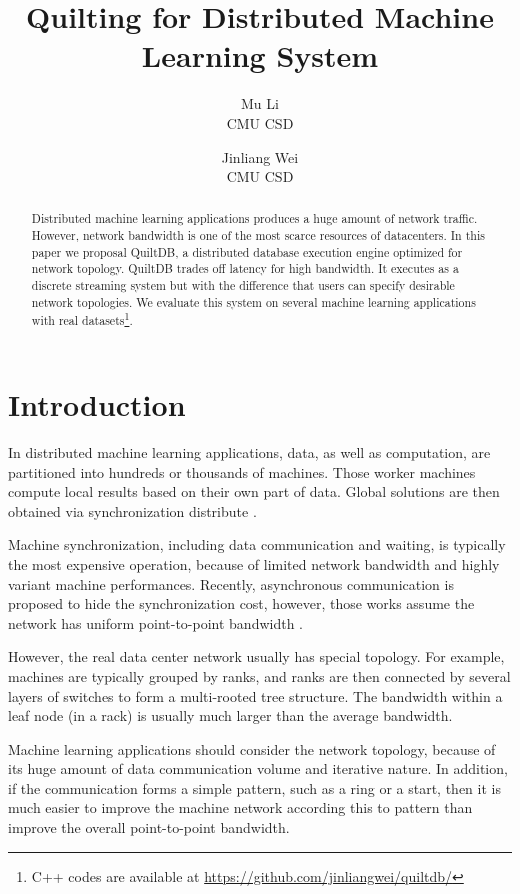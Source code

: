 \documentclass[11pt, twocolumn]{article}
\title{Quilting for Distributed Machine Learning System}
\author{Mu Li \\ CMU CSD \and Jinliang Wei\\ CMU CSD}
\begin{document}
\maketitle

\begin{abstract}
  Distributed machine learning applications produces a huge amount of network
  traffic. However, network bandwidth is one of the most scarce resources of
  datacenters.  In this paper we proposal QuiltDB, a distributed database
  execution engine optimized for network topology. QuiltDB trades off latency
  for high bandwidth. It executes as a discrete streaming system but with the
  difference that
  users can specify desirable network topologies. We evaluate this system on
  several machine learning applications with real datasets\footnote{C++ codes
    are available at \url{https://github.com/jinliangwei/quiltdb/}}.
\end{abstract}

\section{Introduction}

In distributed machine learning applications, data,  as well as computation, are
partitioned into hundreds or  thousands of machines. Those
worker machines compute local results based on their own part of data. Global solutions
are then obtained via synchronization distribute \cite{AhmSheNarJosSmo13,
  HoCipCuiLeeetal13,Lietal13,DeaCorMonCheetal12,GonLowGuBicetal12,CheSonBaiLinetal11}.

Machine synchronization, including data communication and waiting, is typically
the most expensive operation, because of limited network bandwidth and highly
variant machine performances. Recently, asynchronous communication is proposed
to hide the synchronization cost, however, those works assume the network has
uniform point-to-point bandwidth \cite{AsuSmyWel08,SmoNar10,AhmSheNarJosSmo13,Lietal13}.

However, the real data center network usually has special topology. For
example, machines are typically grouped by ranks, and ranks are then connected by
several layers of switches to form a multi-rooted tree structure. The bandwidth
within a leaf node (in a rack) is usually much larger than the average
bandwidth.

Machine learning applications should consider the network topology, because of
its huge amount of data communication volume and iterative nature. In addition,
if the communication forms a simple pattern, such as a ring or a start, then it
is much easier to improve the machine network according this to pattern than
improve the overall point-to-point bandwidth.
\end{document}
